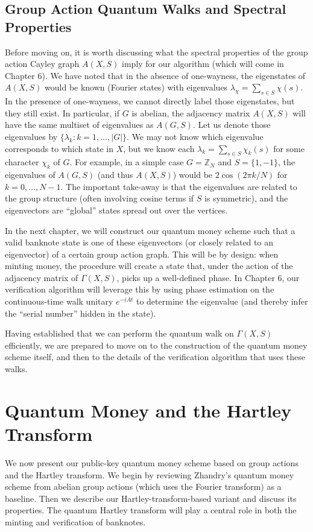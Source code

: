 \documentclass[11pt]{article}
\theoremstyle{definition}
\begin{document}
\section{Group Action Quantum Walks and Spectral Properties}
Before moving on, it is worth discussing what the spectral properties of the group action Cayley graph $A(X,S)$ imply for our algorithm (which will come in Chapter 6). We have noted that in the absence of one-wayness, the eigenstates of $A(X,S)$ would be known (Fourier states) with eigenvalues $\lambda_{\chi} = \sum_{s\in S} \chi(s)$. In the presence of one-wayness, we cannot directly label those eigenstates, but they still exist. In particular, if $G$ is abelian, the adjacency matrix $A(X,S)$ will have the same multiset of eigenvalues as $A(G,S)$. Let us denote those eigenvalues by $\{\lambda_k: k=1,\dots,|G|\}$. We may not know which eigenvalue corresponds to which state in $X$, but we know each $\lambda_k = \sum_{s\in S} \chi_k(s)$ for some character $\chi_k$ of $G$. For example, in a simple case $G = \mathbb{Z}_N$ and $S=\{1, -1\}$, the eigenvalues of $A(G,S)$ (and thus $A(X,S)$) would be $2\cos(2\pi k/N)$ for $k=0,\dots,N-1$. The important take-away is that the eigenvalues are related to the group structure (often involving cosine terms if $S$ is symmetric), and the eigenvectors are “global” states spread out over the vertices.

In the next chapter, we will construct our quantum money scheme such that a valid banknote state is one of these eigenvectors (or closely related to an eigenvector) of a certain group action graph. This will be by design: when minting money, the procedure will create a state that, under the action of the adjacency matrix of $\Gamma(X,S)$, picks up a well-defined phase. In Chapter 6, our verification algorithm will leverage this by using phase estimation on the continuous-time walk unitary $e^{-iA t}$ to determine the eigenvalue (and thereby infer the “serial number” hidden in the state).

Having established that we can perform the quantum walk on $\Gamma(X,S)$ efficiently, we are prepared to move on to the construction of the quantum money scheme itself, and then to the details of the verification algorithm that uses these walks.

\chapter{Quantum Money and the Hartley Transform}
We now present our public-key quantum money scheme based on group actions and the Hartley transform. We begin by reviewing Zhandry’s quantum money scheme from abelian group actions (which uses the Fourier transform) as a baseline. Then we describe our Hartley-transform-based variant and discuss its properties. The quantum Hartley transform will play a central role in both the minting and verification of banknotes.
\end{document}
